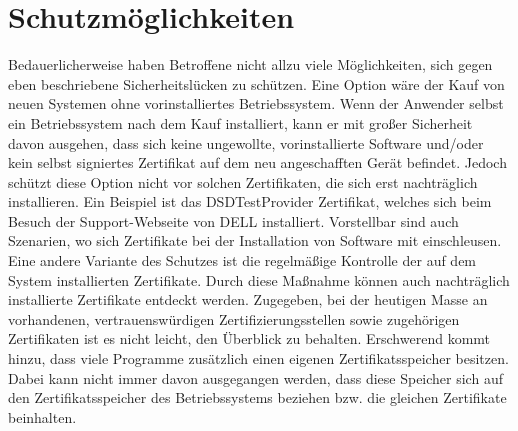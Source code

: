 \section{Schutzmöglichkeiten}
Bedauerlicherweise haben Betroffene nicht allzu viele Möglichkeiten, sich gegen eben beschriebene Sicherheitslücken zu schützen. 
Eine Option wäre der Kauf von neuen Systemen ohne vorinstalliertes Betriebssystem. Wenn der Anwender selbst ein Betriebssystem nach dem Kauf installiert, kann er mit großer Sicherheit davon ausgehen, dass sich keine ungewollte, vorinstallierte Software und/oder kein selbst signiertes Zertifikat auf dem neu angeschafften Gerät befindet. Jedoch schützt diese Option nicht vor solchen Zertifikaten, die sich erst nachträglich installieren. Ein Beispiel ist das DSDTestProvider Zertifikat, welches sich beim Besuch der Support-Webseite von DELL installiert. Vorstellbar sind auch Szenarien, wo sich Zertifikate bei der Installation von Software mit einschleusen.
Eine andere Variante des Schutzes ist die regelmäßige Kontrolle der auf dem System installierten Zertifikate. Durch diese Maßnahme können auch nachträglich installierte Zertifikate entdeckt werden. Zugegeben, bei der heutigen Masse an vorhandenen, vertrauenswürdigen Zertifizierungsstellen sowie zugehörigen Zertifikaten ist es nicht leicht, den Überblick zu behalten. Erschwerend kommt hinzu, dass viele Programme zusätzlich einen eigenen Zertifikatsspeicher besitzen. Dabei kann nicht immer davon ausgegangen werden, dass diese Speicher sich auf den Zertifikatsspeicher des Betriebssystems beziehen bzw. die gleichen Zertifikate beinhalten.
